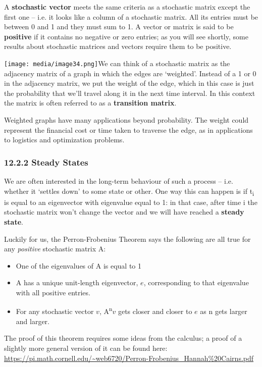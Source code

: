 \documentclass[oneside,english]{amsbook}
\numberwithin{section}{chapter}
\theoremstyle{plain}
\theoremstyle{definition}
\begin{document}
A \textbf{stochastic vector} meets the same criteria as a stochastic
matrix except the first one -- i.e. it looks like a column of a
stochastic matrix. All its entries must be between 0 and 1 and they must
sum to 1. A vector or matrix is said to be \textbf{positive} if it
contains no negative or zero entries; as you will see shortly, some
results about stochastic matrices and vectors require them to be
positive.

\texttt{[image: media/image34.png]}We
can think of a stochastic matrix as the adjacency matrix of a graph in
which the edges are `weighted'. Instead of a 1 or 0 in the adjacency
matrix, we put the weight of the edge, which in this case is just the
probability that we'll travel along it in the next time interval. In
this context the matrix is often referred to as a \textbf{transition
	matrix}.

Weighted graphs have many applications beyond probability. The weight
could represent the financial cost or time taken to traverse the edge,
as in applications to logistics and optimization problems.

\subsubsection{12.2.2 Steady States}\label{steady-states}

We are often interested in the long-term behaviour of such a process --
i.e. whether it `settles down' to some state or other. One way this
can happen is if t\textsubscript{i} is equal to an eigenvector with
eigenvalue equal to 1: in that case, after time i the stochastic matrix
won't change the vector and we will have reached a \textbf{steady
	state}.

Luckily for us, the Perron-Frobenius Theorem says the following are all
true for any \emph{positive} stochastic matrix A:

\begin{itemize}
	\item
	One of the eigenvalues of A is equal to 1
	\item
	A has a unique unit-length eigenvector, $e$, corresponding to that
	eigenvalue with all positive entries.
	\item
	For any stochastic vector $v$, A\textsuperscript{n}$v$ gets
	closer and closer to $e$ as n gets larger and larger.
\end{itemize}

The proof of this theorem requires some ideas from the calculus; a proof
of a slightly more general version of it can be found here:
\url{https://pi.math.cornell.edu/~web6720/Perron-Frobenius_Hannah\%20Cairns.pdf}
\end{document}
